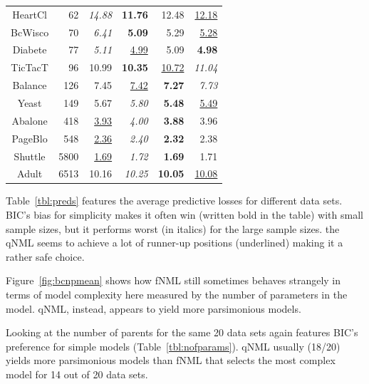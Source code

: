 \begin{table}
\begin{center}
\begin{tabular}{crrrrr}
 HeartCl &    62 &    \textit{14.88} &    \textbf{11.76} &              12.48 &  \underline{12.18} \\
 BcWisco &    70 &     \textit{6.41} &     \textbf{5.09} &               5.29 &   \underline{5.28} \\
 Diabete &    77 &     \textit{5.11} &  \underline{4.99} &               5.09 &      \textbf{4.98} \\
 TicTacT &    96 &             10.99 &    \textbf{10.35} &  \underline{10.72} &     \textit{11.04} \\
 Balance &   126 &              7.45 &  \underline{7.42} &      \textbf{7.27} &      \textit{7.73} \\
   Yeast &   149 &              5.67 &     \textit{5.80} &      \textbf{5.48} &   \underline{5.49} \\
 Abalone &   418 &  \underline{3.93} &     \textit{4.00} &      \textbf{3.88} &               3.96 \\
 PageBlo &   548 &  \underline{2.36} &     \textit{2.40} &      \textbf{2.32} &               2.38 \\
 Shuttle &  5800 &  \underline{1.69} &     \textit{1.72} &      \textbf{1.69} &               1.71 \\
   Adult &  6513 &             10.16 &    \textit{10.25} &     \textbf{10.05} &  \underline{10.08} \\
\end{tabular}
\end{center}
\end{table}

Table~\ref{tbl:preds} features the average predictive losses for different
data sets.  BIC's bias for simplicity makes it often win (written bold
in the table) with small sample sizes, but it performs worst (in
italics) for the large sample sizes. the qNML seems to achieve a lot
of runner-up positions (underlined) making it a rather safe choice.

Figure~\ref{fig:bcnpmean} shows how fNML still sometimes behaves
strangely in terms of model complexity here measured by the number of
parameters in the model. qNML, instead, appears to yield more
parsimonious models.

Looking at the number of parents for the same 20 data sets again
features BIC's preference for simple models
(Table~\ref{tbl:nofparams}).  qNML usually (18/20) yields more
parsimonious models than fNML that selects the most complex model for 14
out of 20 data sets.

